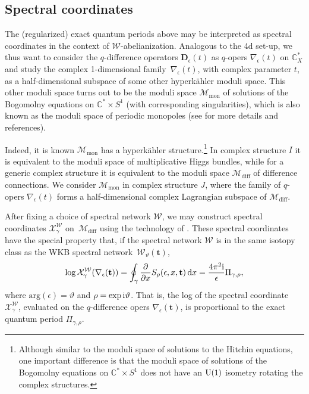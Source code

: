 \documentclass[pdftex]{sigma}
\numberwithin{equation}{section}
\begin{document}
\subsection{Spectral coordinates}\label{sec:abelianization}

The (regularized) exact quantum periods above may be interpreted as spectral coordinates in the context of $\mathcal{W}$-abelianization. Analogous to the 4d set-up, we thus want to consider the $q$-difference operators $\mathbf{D}_\epsilon(t)$ as $q$-opers $\nabla_\epsilon(t)$ on $\mathbb{C}^*_X$ and study the complex 1-dimensional family~$\nabla_\epsilon(t)$, with complex parameter $t$, as a half-dimensional subspace of some other hyperk\"ahler moduli space. This other moduli space turns out to be the moduli space $\mathcal{M}_\mathrm{mon}$ of solutions of the Bogomolny equations on $\mathbb{C}^* \times S^1$ (with corresponding singularities), which is also known as the moduli space of periodic monopoles (see \cite{Elliott:2018yqm} for more details and references).

Indeed, it is known $\mathcal{M}_\mathrm{mon}$ has a hyperk\"ahler structure.\footnote{Although similar to the moduli space of solutions to the Hitchin equations, one important difference is that the moduli space of solutions of the Bogomolny equations on $\mathbb{C}^* \times S^1$ does not have an ${\rm U}(1)$ isometry rotating the complex structures.}
In complex structure $I$ it is equivalent to the moduli space of multiplicative Higgs bundles, while for a generic complex structure it is equivalent to the moduli space $\mathcal{M}_\mathrm{diff}$ of difference connections. We consider $\mathcal{M}_\mathrm{mon}$ in complex structure $J$, where the family of $q$-opers $\nabla_\epsilon(t)$ forms a half-dimensional complex Lagrangian subspace of $\mathcal{M}_\mathrm{diff}$.

After fixing a choice of spectral network $\mathcal{W}$, we may construct spectral coordinates $\mathcal{X}^\mathcal{W}_\gamma$ on~$\mathcal{M}_\mathrm{diff}$ using the technology of \cite{Hollands:2013qza}. These spectral coordinates have the special property that, if the spectral network $\mathcal{W}$ is in the same isotopy class as the WKB spectral network~$\mathcal{W}_\vartheta(\mathbf{\mathbf{t}})$,
\begin{equation*}%
 \log \mathcal{X}^\mathcal{W}_\gamma (\nabla_\epsilon(\mathbf{t})) = \oint_\gamma \frac{\partial}{\partial x} S_\rho(\epsilon,x,\mathbf{t}) \,{\rm d}x = \frac{4 \pi^2 \mathrm{i}}{\epsilon} \Pi_{\gamma,\rho},
\end{equation*}
where $\mathrm{arg}(\epsilon) = \vartheta$ and $\rho = \exp {\rm i} \vartheta$.
That is, the log of the spectral coordinate $\mathcal{X}^\mathcal{W}_\gamma$, evaluated on the $q$-difference opers $\nabla_\epsilon(\mathbf{t})$, is proportional to the exact quantum period $\Pi_{\gamma,\rho}$.
\end{document}
